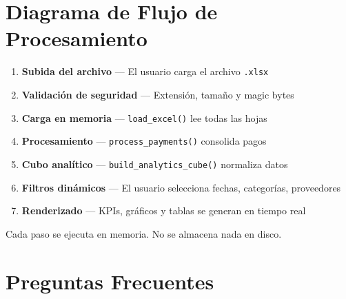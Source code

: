\documentclass[11pt,a4paper]{article}
\begin{document}
\section{Diagrama de Flujo de Procesamiento}

\begin{center}
\begin{tcolorbox}[colback=verde!5, colframe=verde, width=12cm, title=\textbf{Pipeline de Procesamiento}]
\begin{enumerate}[noitemsep]
    \item \textbf{Subida del archivo} --- El usuario carga el archivo \texttt{.xlsx}
    \item \textbf{Validaci\'{o}n de seguridad} --- Extensi\'{o}n, tama\~{n}o y magic bytes
    \item \textbf{Carga en memoria} --- \texttt{load\_excel()} lee todas las hojas
    \item \textbf{Procesamiento} --- \texttt{process\_payments()} consolida pagos
    \item \textbf{Cubo anal\'{i}tico} --- \texttt{build\_analytics\_cube()} normaliza datos
    \item \textbf{Filtros din\'{a}micos} --- El usuario selecciona fechas, categor\'{i}as, proveedores
    \item \textbf{Renderizado} --- KPIs, gr\'{a}ficos y tablas se generan en tiempo real
\end{enumerate}

\vspace{0.3cm}
\centering
\small\textcolor{gris}{Cada paso se ejecuta en memoria. No se almacena nada en disco.}
\end{tcolorbox}
\end{center}

\section{Preguntas Frecuentes}
\end{document}
